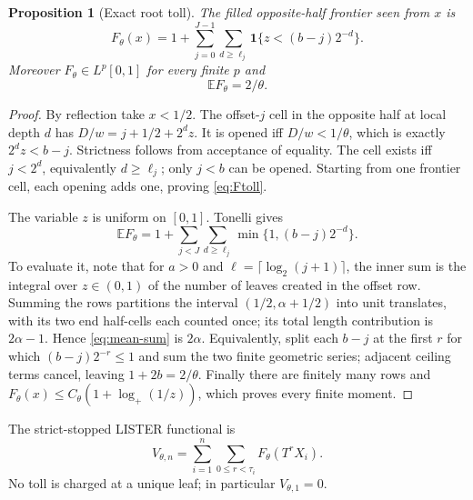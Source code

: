 \documentclass[11pt]{article}
\numberwithin{equation}{section}
\newtheorem{proposition}[theorem]{Proposition}
\theoremstyle{definition}\newtheorem{definition}[theorem]{Definition}
\theoremstyle{remark}\newtheorem{remark}[theorem]{Remark}
\newcommand{\E}{\mathbb E}\newcommand{\Pp}{\mathbb P}
\newcommand{\1}{\mathbf 1}\newcommand{\cD}{\mathcal D}
\begin{document}
\begin{proposition}[Exact root toll]\label{prop:toll}
The filled opposite-half frontier seen from $x$ is
\begin{equation}
 F_\theta(x)=1+\sum_{j=0}^{J-1}\sum_{d\ge\ell_j}
 \1\{z<(b-j)2^{-d}\}.                                      \label{eq:Ftoll}
\end{equation}
Moreover $F_\theta\in L^p[0,1]$ for every finite $p$ and
\begin{equation}\E F_\theta=2/\theta.                         \label{eq:Fmean}
\end{equation}
\end{proposition}
\begin{proof}
By reflection take $x<1/2$.  The offset-$j$ cell in the opposite half at
local depth $d$ has $D/w=j+1/2+2^dz$.  It is opened iff $D/w<1/\theta$,
which is exactly $2^dz<b-j$.  Strictness follows from acceptance of equality.
The cell exists iff $j<2^d$, equivalently $d\ge\ell_j$; only $j<b$ can be
opened.  Starting from one frontier cell, each opening adds one, proving
\eqref{eq:Ftoll}.

The variable $z$ is uniform on $[0,1]$.  Tonelli gives
\begin{equation}
 \E F_\theta=1+\sum_{j<J}\sum_{d\ge\ell_j}
 \min\{1,(b-j)2^{-d}\}.                                    \label{eq:mean-sum}
\end{equation}
To evaluate it, note that for $a>0$ and $\ell=\lceil\log_2(j+1)\rceil$,
the inner sum is the integral over $z\in(0,1)$ of the number of leaves
created in the offset row.  Summing the rows partitions the interval
$(1/2,\alpha+1/2)$ into unit translates, with its two end half-cells each
counted once; its total length contribution is $2\alpha-1$.  Hence
\eqref{eq:mean-sum} is $2\alpha$.  Equivalently, split each $b-j$ at the
first $r$ for which $(b-j)2^{-r}\le1$ and sum the two finite geometric
series; adjacent ceiling terms cancel, leaving $1+2b=2/\theta$.
Finally there are finitely many rows and
$F_\theta(x)\le C_\theta(1+\log_+(1/z))$, which proves every finite moment.
\end{proof}

The strict-stopped LISTER functional is
\begin{equation}
 V_{\theta,n}=\sum_{i=1}^n\sum_{0\le r<\tau_i}F_\theta(T^rX_i).
                                                                  \label{eq:Vdef}
\end{equation}
No toll is charged at a unique leaf; in particular $V_{\theta,1}=0$.
\end{document}

